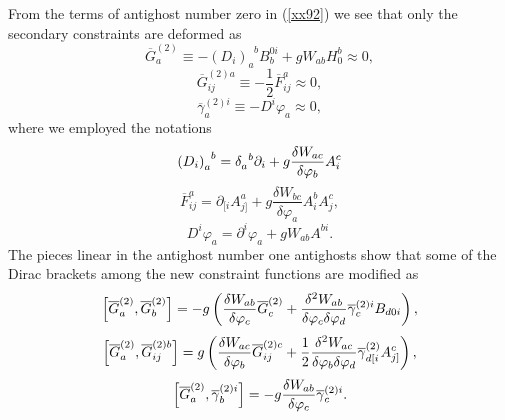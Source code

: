\documentclass[a4paper,12pt]{article}
\begin{document}
From the terms of antighost number zero in (\ref{xx92}) we see that only the
secondary constraints are deformed as 
\begin{equation}
\overline{G}_{a}^{(2)}\equiv -\left( D_{i}\right)
_{a}^{\;\;b}B_{b}^{0i}+gW_{ab}H_{0}^{b}\approx 0,  \label{xx94}
\end{equation}
\begin{equation}
\overline{G}_{ij}^{(2)a}\equiv -\frac{1}{2}\overline{F}_{ij}^{a}\approx 0,
\label{xx95}
\end{equation}
\begin{equation}
\overline{\gamma }_{a}^{(2)i}\equiv -D^{i}\varphi _{a}\approx 0,
\label{xx96}
\end{equation}
where we employed the notations 
\begin{equation}
\left( D_{i}\right) _{a}^{\;\;b}=\delta _{a}^{\;\;b}\partial _{i}+g\frac{%
\delta W_{ac}}{\delta \varphi _{b}}A_{i}^{c}  \label{xx97}
\end{equation}
\begin{equation}
\overline{F}_{ij}^{a}=\partial _{[i}A_{j]}^{a}+g\frac{\delta W_{bc}}{\delta
\varphi _{a}}A_{i}^{b}A_{j}^{c},  \label{xx98}
\end{equation}
\begin{equation}
D^{i}\varphi _{a}=\partial ^{i}\varphi _{a}+gW_{ab}A^{bi}.  \label{xx99}
\end{equation}
The pieces linear in the antighost number one antighosts show that some of
the Dirac brackets among the new constraint functions are modified as 
\begin{equation}
\left[ \overline{G}_{a}^{(2)},\overline{G}_{b}^{(2)}\right] =-g\left( \frac{%
\delta W_{ab}}{\delta \varphi _{c}}\overline{G}_{c}^{(2)}+\frac{\delta
^{2}W_{ab}}{\delta \varphi _{c}\delta \varphi _{d}}\overline{\gamma }%
_{c}^{(2)i}B_{d0i}\right) ,  \label{xx100}
\end{equation}
\begin{equation}
\left[ \overline{G}_{a}^{(2)},\overline{G}_{ij}^{(2)b}\right] =g\left( \frac{%
\delta W_{ac}}{\delta \varphi _{b}}\overline{G}_{ij}^{(2)c}+\frac{1}{2}\frac{%
\delta ^{2}W_{ac}}{\delta \varphi _{b}\delta \varphi _{d}}\overline{\gamma }%
_{d[i}^{(2)}A_{j]}^{c}\right) ,  \label{xx101}
\end{equation}
\begin{equation}
\left[ \overline{G}_{a}^{(2)},\overline{\gamma }_{b}^{(2)i}\right] =-g\frac{%
\delta W_{ab}}{\delta \varphi _{c}}\overline{\gamma }_{c}^{(2)i}.
\label{xx102}
\end{equation}
\end{document}
